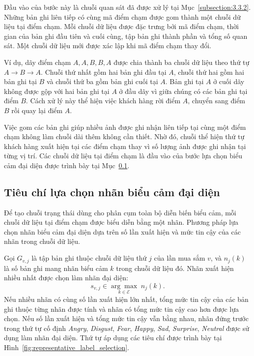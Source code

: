 \documentclass[../LuanVan.tex]{subfiles}
\begin{document}
Đầu vào của bước này là chuỗi quan sát đã được xử lý tại Mục~\ref{subsection:3.3.2}. Những bản ghi liên tiếp có cùng mã điểm chạm được gom thành một chuỗi dữ liệu tại điểm chạm. Mỗi chuỗi dữ liệu được đặc trưng bởi mã điểm chạm, thời gian của bản ghi đầu tiên và cuối cùng, tập bản ghi thành phần và tổng số quan sát. Một chuỗi dữ liệu mới được xác lập khi mã điểm chạm thay đổi.

Ví dụ, dãy điểm chạm $A,A,B,B,A$ được chia thành ba chuỗi dữ liệu theo thứ tự $A\rightarrow B\rightarrow A$. Chuỗi thứ nhất gồm hai bản ghi đầu tại $A$, chuỗi thứ hai gồm hai bản ghi tại $B$ và chuỗi thứ ba gồm bản ghi cuối tại $A$. Bản ghi tại $A$ ở cuối dãy không được gộp với hai bản ghi tại $A$ ở đầu dãy vì giữa chúng có các bản ghi tại điểm $B$. Cách xử lý này thể hiện việc khách hàng rời điểm $A$, chuyển sang điểm $B$ rồi quay lại điểm $A$.

Việc gom các bản ghi giúp nhiều ảnh được ghi nhận liên tiếp tại cùng một điểm chạm không làm chuỗi dài thêm không cần thiết. Nhờ đó, chuỗi thể hiện thứ tự khách hàng xuất hiện tại các điểm chạm thay vì số lượng ảnh được ghi nhận tại từng vị trí. Các chuỗi dữ liệu tại điểm chạm là đầu vào của bước lựa chọn biểu cảm đại diện được trình bày tại Mục~\ref{subsection:3.3.4}.

\subsection{Tiêu chí lựa chọn nhãn biểu cảm đại diện}
\label{subsection:3.3.4}

Để tạo chuỗi trạng thái dùng cho phân cụm toàn bộ diễn biến biểu cảm, mỗi chuỗi dữ liệu tại điểm chạm được biểu diễn bằng một nhãn. Phương pháp lựa chọn nhãn biểu cảm đại diện dựa trên số lần xuất hiện và mức tin cậy của các nhãn trong chuỗi dữ liệu.

Gọi $G_{v,j}$ là tập bản ghi thuộc chuỗi dữ liệu thứ $j$ của lần mua sắm $v$, và $n_j(k)$ là số bản ghi mang nhãn biểu cảm $k$ trong chuỗi dữ liệu đó. Nhãn xuất hiện nhiều nhất được chọn làm nhãn đại diện:
\begin{equation}
    s_{v,j}\in\underset{k\in\mathcal{E}}{\arg\max}\;n_j(k).
    \label{eq:ch3_segment_state}
\end{equation}
Nếu nhiều nhãn có cùng số lần xuất hiện lớn nhất, tổng mức tin cậy của các bản ghi thuộc từng nhãn được tính và nhãn có tổng mức tin cậy cao hơn được lựa chọn. Nếu số lần xuất hiện và tổng mức tin cậy vẫn bằng nhau, nhãn đứng trước trong thứ tự cố định \textit{Angry}, \textit{Disgust}, \textit{Fear}, \textit{Happy}, \textit{Sad}, \textit{Surprise}, \textit{Neutral} được sử dụng làm nhãn đại diện. Thứ tự áp dụng các tiêu chí được trình bày tại Hình~\ref{fig:representative_label_selection}.
\end{document}
